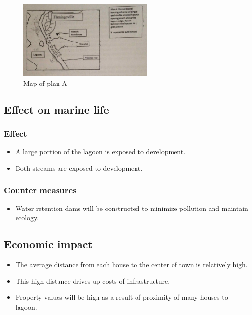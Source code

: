 \documentclass{article}
\begin{document}
\begin{figure}[h!]
	\centering
	\includegraphics[width=0.6\textwidth]{plan_a}
	\caption{Map of plan A}
\end{figure}

\subsection{Effect on marine life}
\subsubsection{Effect}
\begin{itemize}
	\item A large portion of the lagoon is exposed to development.
	\item Both streams are exposed to development.
\end{itemize}

\subsubsection{Counter measures}
\begin{itemize}
	\item Water retention dams will be constructed to minimize pollution and maintain ecology.
\end{itemize}

\subsection{Economic impact}
\begin{itemize}
	\item The average distance from each house to the center of town is relatively high.
	\item This high distance drives up costs of infrastructure.
	\item Property values will be high as a result of proximity of many houses to lagoon.
\end{itemize}
\end{document}
